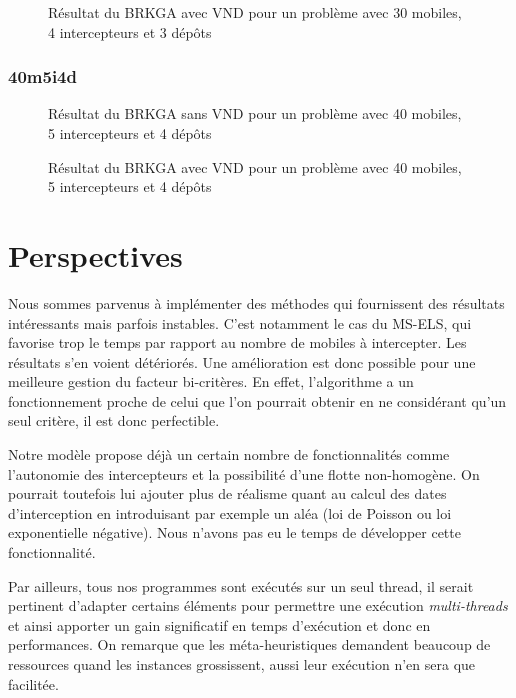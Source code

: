                 \begin{figure}[H]
                	
                \caption{Résultat du BRKGA avec VND pour un problème avec 30 mobiles, 4 intercepteurs et 3 dépôts}
				\label{fig:30m4i3d-avecvnd}
				\end{figure}
				
            \subsubsection{40m5i4d}
            	\begin{figure}[H]
                	
                \caption{Résultat du BRKGA sans VND pour un problème avec 40 mobiles, 5 intercepteurs et 4 dépôts}
				\label{fig:40m5i4d-sansvnd}
                \end{figure}
                
                \begin{figure}[H]
                	
                \caption{Résultat du BRKGA avec VND pour un problème avec 40 mobiles, 5 intercepteurs et 4 dépôts}
				\label{fig:40m5i4d-avecvnd}
				\end{figure}
				

    \section{Perspectives}

        Nous sommes parvenus à implémenter des méthodes qui fournissent des résultats intéressants mais parfois instables. C'est notamment le cas du MS-ELS, qui favorise trop le temps par rapport au nombre de mobiles à intercepter. Les résultats s'en voient détériorés. Une amélioration est donc possible pour une meilleure gestion du facteur bi-critères. En effet, l'algorithme a un fonctionnement proche de celui que l'on pourrait obtenir en ne considérant qu'un seul critère, il est donc perfectible.

        Notre modèle propose déjà un certain nombre de fonctionnalités comme l'autonomie des intercepteurs et la possibilité d'une flotte non-homogène. On pourrait toutefois lui ajouter plus de réalisme quant au calcul des dates d'interception en introduisant par exemple un aléa (loi de Poisson ou loi exponentielle négative). Nous n'avons pas eu le temps de développer cette fonctionnalité.

        Par ailleurs, tous nos programmes sont exécutés sur un seul thread, il serait pertinent d'adapter certains éléments pour permettre une exécution \emph{multi-threads} et ainsi apporter un gain significatif en temps d'exécution et donc en performances. On remarque que les méta-heuristiques demandent beaucoup de ressources quand les instances grossissent, aussi leur exécution n'en sera que facilitée.
